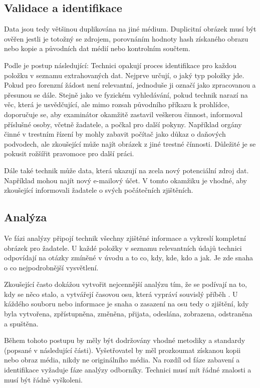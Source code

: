 \documentclass[thesis=B,czech]{FITthesis}[2012/06/26]
\begin{document}
\subsection{Validace a identifikace}

Data jsou tedy většinou duplikována na jiné médium. Duplicitní obrázek musí být ověřen jestli je totožný se zdrojem, porovnáním hodnoty hash získaného obrazu nebo kopie a původních dat médií nebo kontrolním součtem.


Podle \cite{carroll2008computer} je postup následující: Technici opakují proces identifikace pro každou položku v seznamu extrahovaných dat. Nejprve určují, o jaký typ položky jde. Pokud pro forenzní žádost není relevantní, jednoduše ji označí jako zpracovanou a přesunou se dále. Stejně jako ve fyzickém vyhledávání, pokud technik narazí na věc, která je usvědčující, ale mimo rozsah původního příkazu k prohlídce, doporučuje se, aby examinátor okamžitě zastavil veškerou činnost, informoval příslušné osoby, včetně žadatele, a počkal pro další pokyny. Například orgány činné v trestním řízení by mohly zabavit počítač jako důkaz o daňových podvodech, ale zkoušející může najít obrázek z jiné trestné čínnosti. Důležité je se pokusit rožšířit pravomoce pro další práci.

Dále také technik může data, která ukazují na zcela nový potenciální zdroj dat. Například mohou najít nový e-mailový účet. V tomto okamžiku je vhodné, aby zkoušející informovali žadatele o svých počátečních zjištěních.

\subsection{Analýza}
Ve fázi analýzy připojí technik všechny zjištěné informace a vykreslí kompletní obrázek pro žadatele\cite{carroll2008computer}. U každé položky v seznamu relevantních údajů technici odpovídají na otázky zmíněné v úvodu a to co, kdy, kde, kdo a jak. Je zde snaha o co nejpodrobnější vysvětlení.

Zkoušející často dokážou vytvořit nejcennější analýzu tím, že se podívají na to, kdy se něco stalo, a vytvářejí časovou osu, která vypráví souvislý příběh \cite{carroll2008computer}. U káždého souboru nebo informace je snaha o zasazení na osu tedy o zjištění, kdy byla vytvořena, zpřístupněna, změněna, přijata, odeslána, zobrazena, odstraněna a spuštěna. 

Během tohoto postupu by měly být dodržovány vhodné metodiky a standardy (popsané v následující části)\cite{for_sez}. Vyšetřovatel by měl prozkoumat získanou kopii nebo obraz média, nikdy ne originálního média. Na rozdíl od fáze zabavení a identifikace vyžaduje fáze analýzy odborníky. Technici musí mít řádné znalosti a musí být řádně vyškoleni. 
\end{document}
